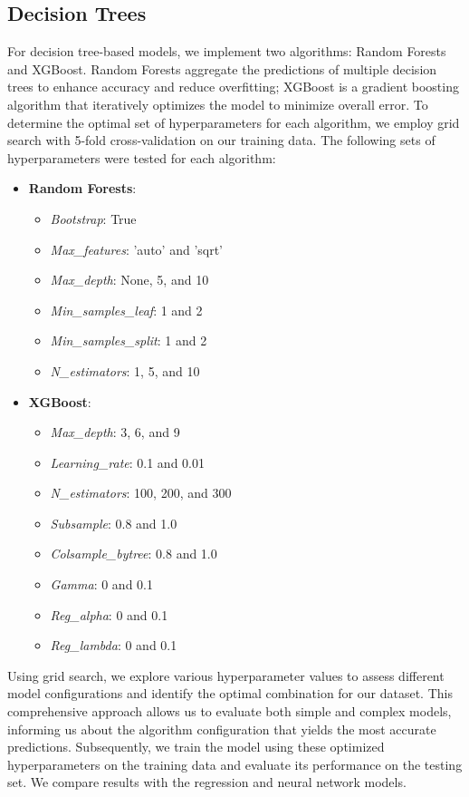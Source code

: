 \documentclass[conference]{IEEEtran}
\begin{document}
\subsection{Decision Trees} 

For decision tree-based models, we implement two algorithms: Random Forests and XGBoost. Random Forests aggregate the predictions of multiple decision trees to enhance accuracy and reduce overfitting; XGBoost is a gradient boosting algorithm that iteratively optimizes the model to minimize overall error. To determine the optimal set of hyperparameters for each algorithm, we employ grid search with 5-fold cross-validation on our training data. The following sets of hyperparameters were tested for each algorithm:

\begin{itemize}
    \item \textbf{Random Forests}: 
    \begin{itemize}
        \item \emph{Bootstrap}: True
        \item \emph{Max\_features}: 'auto' and 'sqrt'
        \item \emph{Max\_depth}: None, 5, and 10
        \item \emph{Min\_samples\_leaf}: 1 and 2
        \item \emph{Min\_samples\_split}: 1 and 2
        \item \emph{N\_estimators}: 1, 5, and 10
    \end{itemize}
    
    \item \textbf{XGBoost}: 
    \begin{itemize}
        \item \emph{Max\_depth}: 3, 6, and 9
        \item \emph{Learning\_rate}: 0.1 and 0.01
        \item \emph{N\_estimators}: 100, 200, and 300
        \item \emph{Subsample}: 0.8 and 1.0
        \item \emph{Colsample\_bytree}: 0.8 and 1.0
        \item \emph{Gamma}: 0 and 0.1
        \item \emph{Reg\_alpha}: 0 and 0.1
        \item \emph{Reg\_lambda}: 0 and 0.1
    \end{itemize}
\end{itemize}

Using grid search, we explore various hyperparameter values to assess different model configurations and identify the optimal combination for our dataset. This comprehensive approach allows us to evaluate both simple and complex models, informing us about the algorithm configuration that yields the most accurate predictions. Subsequently, we train the model using these optimized hyperparameters on the training data and evaluate its performance on the testing set. We compare results with the regression and neural network models.
\end{document}
